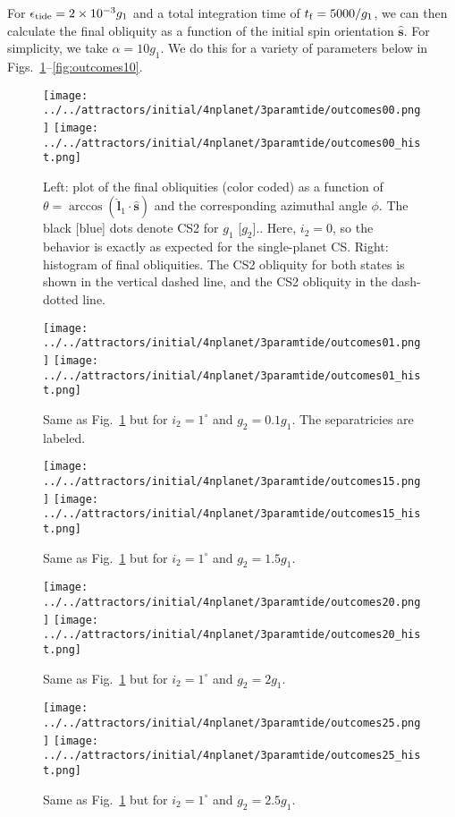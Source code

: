 \documentclass[11pt,
        usenames, %
        dvipsnames %
    ]{article}
\newcommand*{\scinot}[2]{#1\times10^{#2}}
\newcommand*{\bm}[1]{\boldsymbol{\mathbf{#1}}}
\newcommand*{\uv}[1]{\hat{\bm{#1}}}
\newcommand*{\p}[1]{\left(#1\right)}
\begin{document}
For $\epsilon_{\rm tide} = \scinot{2}{-3} g_1$ and a total integration time of
$t_{\rm f} = 5000 / g_1$, we can then calculate the final obliquity as a
function of the initial spin orientation $\uv{s}$. For simplicity, we take
$\alpha = 10g_1$. We do this for a variety of parameters below in
Figs.~\ref{fig:outcomes00}--\ref{fig:outcomes10}.
\begin{figure}
    \centering
    \texttt{[image: ../../attractors/initial/4nplanet/3paramtide/outcomes00.png]}
    \texttt{[image: ../../attractors/initial/4nplanet/3paramtide/outcomes00\_hist.png]}
    \caption{Left: plot of the final obliquities (color coded) as a function of
    $\theta = \arccos\p{\uv{l}_1 \cdot \uv{s}}$ and the corresponding azimuthal
    angle $\phi$. The black [blue] dots denote CS2 for $g_1$ [$g_2$].. Here,
    $i_2 = 0$, so the behavior is exactly as expected for the single-planet
    CS\@. Right: histogram of final obliquities. The CS2 obliquity for both
    states is shown in the vertical dashed line, and the CS2 obliquity in the
    dash-dotted line.}\label{fig:outcomes00}
\end{figure}
\begin{figure}
    \centering
    \texttt{[image: ../../attractors/initial/4nplanet/3paramtide/outcomes01.png]}
    \texttt{[image: ../../attractors/initial/4nplanet/3paramtide/outcomes01\_hist.png]}
    \caption{Same as Fig.~\ref{fig:outcomes00} but for $i_2 = 1^\circ$ and $g_2
    = 0.1g_1$. The separatricies are labeled.}\label{fig:outcomes01}
\end{figure}
\begin{figure}
    \centering
    \texttt{[image: ../../attractors/initial/4nplanet/3paramtide/outcomes15.png]}
    \texttt{[image: ../../attractors/initial/4nplanet/3paramtide/outcomes15\_hist.png]}
    \caption{Same as Fig.~\ref{fig:outcomes00} but for $i_2 = 1^\circ$ and $g_2
    = 1.5g_1$.}\label{fig:outcomes15}
\end{figure}
\begin{figure}
    \centering
    \texttt{[image: ../../attractors/initial/4nplanet/3paramtide/outcomes20.png]}
    \texttt{[image: ../../attractors/initial/4nplanet/3paramtide/outcomes20\_hist.png]}
    \caption{Same as Fig.~\ref{fig:outcomes00} but for $i_2 = 1^\circ$ and $g_2
    = 2g_1$.}\label{fig:outcomes20}
\end{figure}
\begin{figure}
    \centering
    \texttt{[image: ../../attractors/initial/4nplanet/3paramtide/outcomes25.png]}
    \texttt{[image: ../../attractors/initial/4nplanet/3paramtide/outcomes25\_hist.png]}
    \caption{Same as Fig.~\ref{fig:outcomes00} but for $i_2 = 1^\circ$ and $g_2
    = 2.5g_1$.}\label{fig:outcomes25}
\end{figure}
\end{document}

